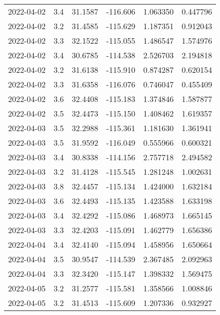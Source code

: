 \begin{tabular}{lrrrrr}
2022-04-02 &       3.4 &  31.1587 &  -116.606 &         1.063350 &         0.447796 \\
2022-04-02 &       3.2 &  31.4585 &  -115.629 &         1.187351 &         0.912043 \\
2022-04-02 &       3.3 &  32.1522 &  -115.055 &         1.486547 &         1.574976 \\
2022-04-02 &       3.4 &  30.6785 &  -114.538 &         2.526703 &         2.194818 \\
2022-04-02 &       3.2 &  31.6138 &  -115.910 &         0.874287 &         0.620154 \\
2022-04-02 &       3.3 &  31.6358 &  -116.076 &         0.746047 &         0.455409 \\
2022-04-02 &       3.6 &  32.4408 &  -115.183 &         1.374846 &         1.587877 \\
2022-04-02 &       3.5 &  32.4473 &  -115.150 &         1.408462 &         1.619357 \\
2022-04-03 &       3.5 &  32.2988 &  -115.361 &         1.181630 &         1.361941 \\
2022-04-03 &       3.5 &  31.9592 &  -116.049 &         0.555966 &         0.600321 \\
2022-04-03 &       3.4 &  30.8338 &  -114.156 &         2.757718 &         2.494582 \\
2022-04-03 &       3.2 &  31.4128 &  -115.545 &         1.281248 &         1.002631 \\
2022-04-03 &       3.8 &  32.4457 &  -115.134 &         1.424000 &         1.632184 \\
2022-04-03 &       3.6 &  32.4493 &  -115.135 &         1.423588 &         1.633198 \\
2022-04-03 &       3.4 &  32.4292 &  -115.086 &         1.468973 &         1.665145 \\
2022-04-03 &       3.3 &  32.4203 &  -115.091 &         1.462779 &         1.656386 \\
2022-04-04 &       3.4 &  32.4140 &  -115.094 &         1.458956 &         1.650664 \\
2022-04-04 &       3.5 &  30.9547 &  -114.539 &         2.367485 &         2.092963 \\
2022-04-04 &       3.3 &  32.3420 &  -115.147 &         1.398332 &         1.569475 \\
2022-04-05 &       3.2 &  31.2577 &  -115.581 &         1.358566 &         1.008846 \\
2022-04-05 &       3.2 &  31.4513 &  -115.609 &         1.207336 &         0.932927 \\

\end{tabular}

